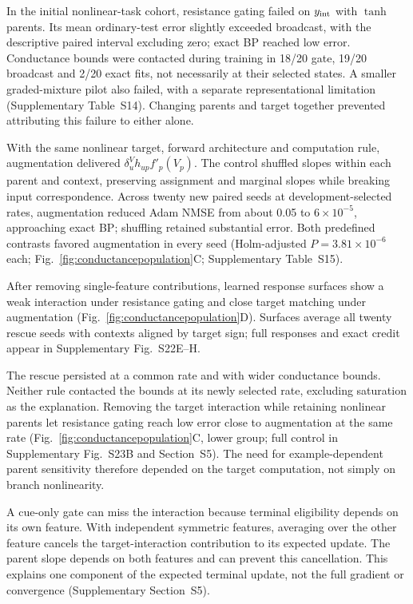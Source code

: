 \documentclass[11pt]{article}
\begin{document}
In the initial nonlinear-task cohort, resistance gating failed on $y_{\rm int}$ with $\tanh$ parents. Its mean ordinary-test error slightly exceeded broadcast, with the descriptive paired interval excluding zero; exact BP reached low error. Conductance bounds were contacted during training in 18/20 gate, 19/20 broadcast and 2/20 exact fits, not necessarily at their selected states. A smaller graded-mixture pilot also failed, with a separate representational limitation (Supplementary Table~S14). Changing parents and target together prevented attributing this failure to either alone.

With the same nonlinear target, forward architecture and computation rule, augmentation delivered $\delta_u^Vh_{up}f'_p(V_p)$. The control shuffled slopes within each parent and context, preserving assignment and marginal slopes while breaking input correspondence. Across twenty new paired seeds at development-selected rates, augmentation reduced Adam NMSE from about 0.05 to $6\times10^{-5}$, approaching exact BP; shuffling retained substantial error. Both predefined contrasts favored augmentation in every seed (Holm-adjusted $P=3.81\times10^{-6}$ each; Fig.~\ref{fig:conductancepopulation}C; Supplementary Table~S15).

After removing single-feature contributions, learned response surfaces show a weak interaction under resistance gating and close target matching under augmentation (Fig.~\ref{fig:conductancepopulation}D). Surfaces average all twenty rescue seeds with contexts aligned by target sign; full responses and exact credit appear in Supplementary Fig.~S22E--H.

The rescue persisted at a common rate and with wider conductance bounds. Neither rule contacted the bounds at its newly selected rate, excluding saturation as the explanation. Removing the target interaction while retaining nonlinear parents let resistance gating reach low error close to augmentation at the same rate (Fig.~\ref{fig:conductancepopulation}C, lower group; full control in Supplementary Fig.~S23B and Section~S5). The need for example-dependent parent sensitivity therefore depended on the target computation, not simply on branch nonlinearity.

A cue-only gate can miss the interaction because terminal eligibility depends on its own feature. With independent symmetric features, averaging over the other feature cancels the target-interaction contribution to its expected update. The parent slope depends on both features and can prevent this cancellation. This explains one component of the expected terminal update, not the full gradient or convergence (Supplementary Section~S5).
\end{document}
